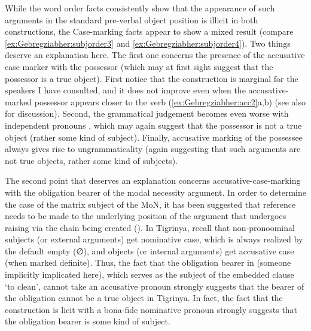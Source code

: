 \documentclass[output=paper]{langscibook}
\begin{document}
\noindent While the word order facts consistently show that the appearance of such arguments in the standard pre-verbal object position is illicit in both constructions, the Case-marking facts appear to show a mixed result (compare \ref{ex:Gebregziabher:subjorder3} and \ref{ex:Gebregziabher:subjorder4}). Two things deserve an explanation here. The first one concerns the presence of the accusative case marker with the possessor (which may at first sight suggest that the possessor is a true object). First notice that the construction is marginal for the speakers I have consulted, and it does not improve even when the accusative-marked possessor appears closer to the verb (\ref{ex:Gebregziabher:acc2}a,b) (see also  for discussion). Second, the grammatical judgement becomes even worse with independent pronouns , which may again suggest that the possessor is not a true object (rather some kind of subject). Finally, accusative marking of the possessee always gives rise to ungrammaticality  (again suggesting that such arguments are not true objects, rather some kind of subjects).   


\ea\label{ex:Gebregziabher:acc2}
\z
\z

\noindent The second point that deserves an explanation concerns accusative-case-mark\-ing with the obligation bearer of the modal necessity argument. In order to determine the case of the matrix subject of the MoN, it has been suggested that reference needs to be made to the underlying position of the argument that undergoes raising via the chain being created (\citealt{bhatt97}). In Tigrinya, recall that non-pronoominal subjects (or external arguments) get nominative case, which is always realized by the default empty (∅), and objects (or internal arguments) get accusative case (when marked definite). Thus, the fact that the obligation bearer in  (someone implicitly implicated here), which serves as the subject of the embedded clause `to clean', cannot take an accusative pronoun  strongly suggests that the bearer of the obligation cannot be a true object in Tigrinya. In fact, the fact that the construction is licit with a bona-fide nominative pronoun strongly suggests that the obligation bearer is some kind of subject.
\end{document}
